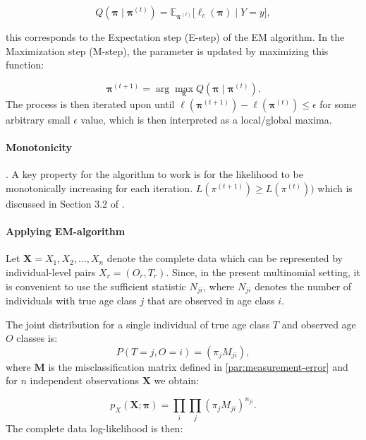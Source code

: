 \documentclass[11pt,a4paper]{article}
\begin{document}
\begin{equation}
	Q(\boldsymbol{\pi} \mid \boldsymbol{\pi}^{(t)}) = \mathbb{E}_{\boldsymbol{\pi}^{(t)}} \big[ \ell_c(\boldsymbol{\pi}) \mid Y = y \big],
	\label{eq:Qfunction}
\end{equation}


this corresponds to the Expectation step (E-step) of the EM algorithm. In the Maximization step (M-step), the parameter is updated by maximizing this function:

\begin{equation}
	\mathbf{\pi}^{(t+1)} = \arg\max_{\mathbf{\pi}} Q(\mathbf{\pi} \mid \mathbf{\pi}^{(t)}).
	\label{eq:arg_max}
\end{equation}
The process is then iterated upon until $\ell(\mathbf{\pi}^{(t+1)}) - \ell(\mathbf{\pi}^{(t)}) \leq  \epsilon$ for some arbitrary small $\epsilon$ value, which is then interpreted as a local/global maxima.

\paragraph{Monotonicity}. A key property for the algorithm to work is for the likelihood to be monotonically increasing for each iteration. $L(\pi^{(t+1)})\geq L(\pi^{(t)}))$ which is discussed in Section 3.2 of \cite{mclachlan2008}.   



\paragraph{Applying EM-algorithm}

Let $\boldsymbol{X} = {X_1, X_2, \ldots, X_n}$ denote the complete data which can be represented by individual-level pairs $X_r = (O_r,T_r)$. Since, in the present multinomial setting, it is convenient to use the sufficient statistic $N_{ji}$, where $N_{ji}$ denotes the number of individuals with true age class $j$ that are observed in age class $i$. 

The joint distribution for a single individual of true age class $T$ and observed age $O$ classes is:
\begin{equation*}
	P(T=j, O=i) = (\pi_j M_{ji}),
\end{equation*}
where $\boldsymbol{M}$ is the misclassification matrix defined in \ref{par:measurement-error} and for $n$ independent observations  $\boldsymbol{X}$ we obtain:

\begin{equation*}
	p_X(\boldsymbol{X};\boldsymbol{\pi}) = \prod_i \prod_j (\pi_j M_{ji})^{n_{ji}}.
\end{equation*}
The complete data log-likelihood is then: 
\end{document}
